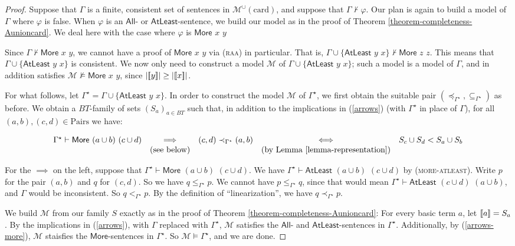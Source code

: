 \documentclass[letterpaper]{article}
\theoremstyle{definition}
\newcommand{\semantics}[1]{[\![\mbox{\em $ #1 $\/}]\!]}
\newcommand{\Model}{\mathcal{M}}
\newcommand{\set}[1]{\{ #1 \}}
\newcommand{\proves}{\vdash}
\newcommand{\Munion}{\mathscr{M}^{\cup}}
\newcommand{\proverule}{\textsc}
\newcommand{\moreatleast}{\proverule{more-atleast}}
\newcommand{\raa}{\proverule{raa}}
\newcommand{\Atleast}[2]{\mathsf{AtLeast}\,\,#1\,\,#2}
\newcommand{\More}[2]{\mathsf{More}\,\,#1\,\,#2}
\newcommand{\AllNoArgs}{\mathsf{All}}
\newcommand{\AtleastNoArgs}{\mathsf{AtLeast}}
\newcommand{\MoreNoArgs}{\mathsf{More}}
\newcommand{\card}{\mathrm{card}}
\newcommand{\Pairs}{\mbox{Pairs}}
\newcommand{\provsubstar}{\subseteq_{\Gamma^\star}}
\newcommand{\provlestar}{\le_{\Gamma^\star}}
\newcommand{\provltstar}{<_{\Gamma^\star}}
\newcommand{\provlestrictstar}{\provltstar}
\newcommand{\provextendedstar}{\preceq_{\Gamma^\star}}
\newcommand{\provextendedstrictstar}{\prec_{\Gamma^\star}}
\begin{document}
\begin{proof}
Suppose that $\Gamma$ is a finite, consistent set of sentences in $\Munion(\card)$, and suppose that $\Gamma \not \proves \varphi$.  Our plan is again to build a model of $\Gamma$ where $\varphi$ is false.
When $\varphi$ is an $\AllNoArgs$- or $\AtleastNoArgs$-sentence, we build our model as in the proof of Theorem \ref{theorem-completeness-Aunioncard}.  We deal here with the case where $\varphi$ is $\More{x}{y}$

Since $\Gamma \not \proves \More{x}{y}$, we cannot have a proof of $\More{x}{y}$ via (\raa) in particular.  That is, $\Gamma \cup \set{\Atleast{y}{x}} \not \proves \More{z}{z}$.  This means that $\Gamma \cup \set{\Atleast{y}{x}}$ is consistent.  We now only need to construct a model $\Model$ of $\Gamma \cup \set{\Atleast{y}{x}}$; such a model is a model of $\Gamma$, and in addition satisfies $\Model \not \models \More{x}{y}$, since $|\semantics{y}| \ge |\semantics{x}|$.

For what follows, let $\Gamma^\star = \Gamma \cup \set{\Atleast{y}{x}}$.  In order to construct the model $\Model$ of $\Gamma^\star$, we first obtain the suitable pair $(\provextendedstar, \provsubstar)$ as before.  We obtain a $BT$-family of sets $(S_{a})_{a \in BT}$ such that, in addition to the implications in (\ref{arrows}) (with $\Gamma^\star$ in place of $\Gamma$), for all $(a, b), (c, d) \in \Pairs$ we have:

\begin{equation}
\label{arrows-more}
\begin{array}{lcccc}
\Gamma^\star \proves \More{(a \cup b)}{(c \cup d)} & \implies & 
    (c,d) \provextendedstrictstar (a,b) & \iff & 
    S_c \cup S_d < S_a \cup S_b\\
& (\textrm{see below}) & & (\textrm{by Lemma \ref{lemma-representation}}) & 
\end{array}
\end{equation}

For the $\implies$ on the left, suppose that $\Gamma^\star \proves \More{(a \cup b)}{(c \cup d)}$.  We have $\Gamma^\star \proves \Atleast{(a \cup b)}{(c \cup d)}$ by (\moreatleast).  Write $p$ for the pair $(a, b)$ and $q$ for $(c, d)$.  So we have $q \provlestar p$.  We cannot have $p \provlestar q$, since that would mean $\Gamma^\star \proves \Atleast{(c \cup d)}{(a \cup b)}$, and $\Gamma$ would be inconsistent.  So $q \provlestrictstar p$.  By the definition of ``linearization'', we have $q \provextendedstrictstar p$.

We build $\Model$ from our family $S$ exactly as in the proof of Theorem \ref{theorem-completeness-Aunioncard}:  For every basic term $a$, let $\semantics{a} = S_a$.  By the implications in (\ref{arrows}), with $\Gamma$ replaced with $\Gamma^\star$, $\Model$ satisfies the $\AllNoArgs$- and $\AtleastNoArgs$-sentences in $\Gamma^\star$.  Additionally, by (\ref{arrows-more}), $\Model$ staisfies the $\MoreNoArgs$-sentences in $\Gamma^\star$.  So $\Model \models \Gamma^\star$, and we are done.

\end{proof}
\end{document}
